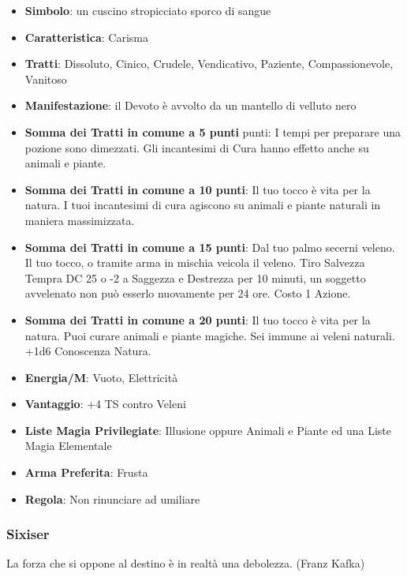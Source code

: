 \begin{multicols}{2}
\begin{itemize}[leftmargin=*] \setlength{\itemsep}{0pt}
\item \textbf{Simbolo}: un cuscino stropicciato sporco di sangue
\item \textbf{Caratteristica}: Carisma
\item \textbf{Tratti}: Dissoluto, Cinico, Crudele, Vendicativo, Paziente, Compassionevole, Vanitoso
\item \textbf{Manifestazione}: il Devoto è avvolto da un mantello di velluto nero
\item \textbf{Somma dei Tratti in comune a 5 punti} punti: I tempi per preparare una pozione sono dimezzati. Gli incantesimi di Cura hanno effetto anche su animali e piante.
\item \textbf{Somma dei Tratti in comune a 10 punti}: Il tuo tocco è vita per la natura. I tuoi incantesimi di cura agiscono su animali e piante naturali in maniera massimizzata.
\item \textbf{Somma dei Tratti in comune a 15 punti}: Dal tuo palmo secerni veleno. Il tuo tocco, o tramite arma in mischia veicola il veleno. Tiro Salvezza Tempra DC 25 o -2 a Saggezza e Destrezza per 10 minuti, un soggetto avvelenato non può esserlo nuovamente per 24 ore. Costo 1 Azione.
\item \textbf{Somma dei Tratti in comune a 20 punti}: Il tuo tocco è vita per la natura. Puoi curare animali e piante magiche. Sei immune ai veleni naturali. +1d6 Conoscenza Natura.
\item \textbf{Energia/M}: Vuoto, Elettricità
\item \textbf{Vantaggio}: +4 TS contro Veleni
\item \textbf{Liste Magia Privilegiate}: Illusione oppure Animali e Piante ed una Liste Magia Elementale
\item \textbf{Arma Preferita}: Frusta
\item \textbf{Regola}: Non rinunciare ad umiliare
\end{itemize}

\subsubsection{Sixiser}\label{sixiser}\hypertarget{sixiser}{}

\begin{changemargin}{0.3cm}{0.3cm}\begin{enfasi}{
La forza che si oppone al destino è in realtà una debolezza. (Franz Kafka)

}
\end{enfasi}
\end{changemargin}
\end{multicols}
